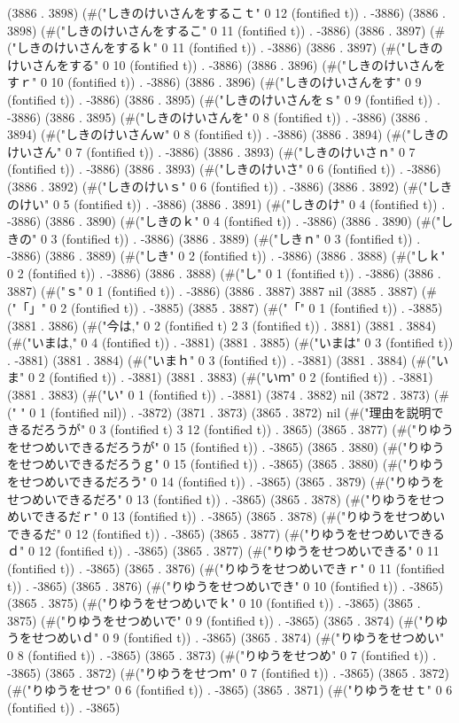 (3886 . 3898) (#("しきのけいさんをするこｔ" 0 12 (fontified t)) . -3886) (3886 . 3898) (#("しきのけいさんをするこ" 0 11 (fontified t)) . -3886) (3886 . 3897) (#("しきのけいさんをするｋ" 0 11 (fontified t)) . -3886) (3886 . 3897) (#("しきのけいさんをする" 0 10 (fontified t)) . -3886) (3886 . 3896) (#("しきのけいさんをすｒ" 0 10 (fontified t)) . -3886) (3886 . 3896) (#("しきのけいさんをす" 0 9 (fontified t)) . -3886) (3886 . 3895) (#("しきのけいさんをｓ" 0 9 (fontified t)) . -3886) (3886 . 3895) (#("しきのけいさんを" 0 8 (fontified t)) . -3886) (3886 . 3894) (#("しきのけいさんｗ" 0 8 (fontified t)) . -3886) (3886 . 3894) (#("しきのけいさん" 0 7 (fontified t)) . -3886) (3886 . 3893) (#("しきのけいさｎ" 0 7 (fontified t)) . -3886) (3886 . 3893) (#("しきのけいさ" 0 6 (fontified t)) . -3886) (3886 . 3892) (#("しきのけいｓ" 0 6 (fontified t)) . -3886) (3886 . 3892) (#("しきのけい" 0 5 (fontified t)) . -3886) (3886 . 3891) (#("しきのけ" 0 4 (fontified t)) . -3886) (3886 . 3890) (#("しきのｋ" 0 4 (fontified t)) . -3886) (3886 . 3890) (#("しきの" 0 3 (fontified t)) . -3886) (3886 . 3889) (#("しきｎ" 0 3 (fontified t)) . -3886) (3886 . 3889) (#("しき" 0 2 (fontified t)) . -3886) (3886 . 3888) (#("しｋ" 0 2 (fontified t)) . -3886) (3886 . 3888) (#("し" 0 1 (fontified t)) . -3886) (3886 . 3887) (#("ｓ" 0 1 (fontified t)) . -3886) (3886 . 3887) 3887 nil (3885 . 3887) (#("「」" 0 2 (fontified t)) . -3885) (3885 . 3887) (#("「" 0 1 (fontified t)) . -3885) (3881 . 3886) (#("今は," 0 2 (fontified t) 2 3 (fontified t)) . 3881) (3881 . 3884) (#("いまは," 0 4 (fontified t)) . -3881) (3881 . 3885) (#("いまは" 0 3 (fontified t)) . -3881) (3881 . 3884) (#("いまｈ" 0 3 (fontified t)) . -3881) (3881 . 3884) (#("いま" 0 2 (fontified t)) . -3881) (3881 . 3883) (#("いｍ" 0 2 (fontified t)) . -3881) (3881 . 3883) (#("い" 0 1 (fontified t)) . -3881) (3874 . 3882) nil (3872 . 3873) (#(" " 0 1 (fontified nil)) . -3872) (3871 . 3873) (3865 . 3872) nil (#("理由を説明できるだろうが" 0 3 (fontified t) 3 12 (fontified t)) . 3865) (3865 . 3877) (#("りゆうをせつめいできるだろうが" 0 15 (fontified t)) . -3865) (3865 . 3880) (#("りゆうをせつめいできるだろうｇ" 0 15 (fontified t)) . -3865) (3865 . 3880) (#("りゆうをせつめいできるだろう" 0 14 (fontified t)) . -3865) (3865 . 3879) (#("りゆうをせつめいできるだろ" 0 13 (fontified t)) . -3865) (3865 . 3878) (#("りゆうをせつめいできるだｒ" 0 13 (fontified t)) . -3865) (3865 . 3878) (#("りゆうをせつめいできるだ" 0 12 (fontified t)) . -3865) (3865 . 3877) (#("りゆうをせつめいできるｄ" 0 12 (fontified t)) . -3865) (3865 . 3877) (#("りゆうをせつめいできる" 0 11 (fontified t)) . -3865) (3865 . 3876) (#("りゆうをせつめいできｒ" 0 11 (fontified t)) . -3865) (3865 . 3876) (#("りゆうをせつめいでき" 0 10 (fontified t)) . -3865) (3865 . 3875) (#("りゆうをせつめいでｋ" 0 10 (fontified t)) . -3865) (3865 . 3875) (#("りゆうをせつめいで" 0 9 (fontified t)) . -3865) (3865 . 3874) (#("りゆうをせつめいｄ" 0 9 (fontified t)) . -3865) (3865 . 3874) (#("りゆうをせつめい" 0 8 (fontified t)) . -3865) (3865 . 3873) (#("りゆうをせつめ" 0 7 (fontified t)) . -3865) (3865 . 3872) (#("りゆうをせつｍ" 0 7 (fontified t)) . -3865) (3865 . 3872) (#("りゆうをせつ" 0 6 (fontified t)) . -3865) (3865 . 3871) (#("りゆうをせｔ" 0 6 (fontified t)) . -3865) 